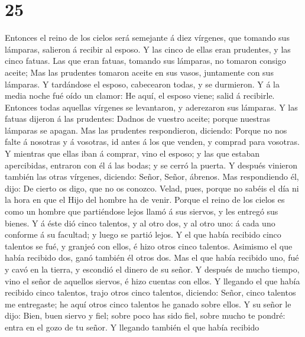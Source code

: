 \hypertarget{section-24}{%
\section{25}\label{section-24}}

 Entonces el reino de los cielos será semejante á diez
vírgenes, que tomando sus lámparas, salieron á recibir al esposo.
 Y las cinco de ellas eran prudentes, y las cinco fatuas.
 Las que eran fatuas, tomando sus lámparas, no tomaron
consigo aceite;  Mas las prudentes tomaron aceite en sus
vasos, juntamente con sus lámparas.  Y tardándose el esposo,
cabecearon todas, y se durmieron.  Y á la media noche fué
oído un clamor: He aquí, el esposo viene; salid á recibirle.
 Entonces todas aquellas vírgenes se levantaron, y
aderezaron sus lámparas.  Y las fatuas dijeron á las
prudentes: Dadnos de vuestro aceite; porque nuestras lámparas se apagan.
 Mas las prudentes respondieron, diciendo: Porque no nos
falte á nosotras y á vosotras, id antes á los que venden, y comprad para
vosotras.  Y mientras que ellas iban á comprar, vino el
esposo; y las que estaban apercibidas, entraron con él á las bodas; y se
cerró la puerta.  Y después vinieron también las otras
vírgenes, diciendo: Señor, Señor, ábrenos.  Mas
respondiendo él, dijo: De cierto os digo, que no os conozco.
 Velad, pues, porque no sabéis el día ni la hora en que el
Hijo del hombre ha de venir.  Porque el reino de los cielos
es como un hombre que partiéndose lejos llamó á sus siervos, y les
entregó sus bienes.  Y á éste dió cinco talentos, y al otro
dos, y al otro uno: á cada uno conforme á su facultad; y luego se partió
lejos.  Y el que había recibido cinco talentos se fué, y
granjeó con ellos, é hizo otros cinco talentos.  Asimismo
el que había recibido dos, ganó también él otros dos.  Mas
el que había recibido uno, fué y cavó en la tierra, y escondió el dinero
de su señor.  Y después de mucho tiempo, vino el señor de
aquellos siervos, é hizo cuentas con ellos.  Y llegando el
que había recibido cinco talentos, trajo otros cinco talentos, diciendo:
Señor, cinco talentos me entregaste; he aquí otros cinco talentos he
ganado sobre ellos.  Y su señor le dijo: Bien, buen siervo
y fiel; sobre poco has sido fiel, sobre mucho te pondré: entra en el
gozo de tu señor.  Y llegando también el que había recibido
